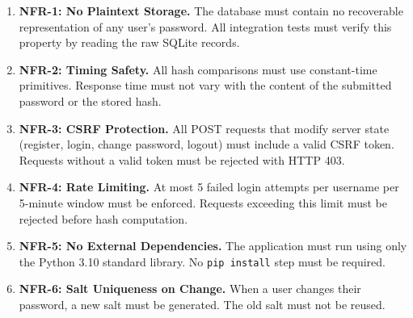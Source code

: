 \begin{enumerate}
  \item \textbf{NFR-1: No Plaintext Storage.} The database must contain no recoverable representation of any user's password. All integration tests must verify this property by reading the raw SQLite records.

  \item \textbf{NFR-2: Timing Safety.} All hash comparisons must use constant-time primitives. Response time must not vary with the content of the submitted password or the stored hash.

  \item \textbf{NFR-3: CSRF Protection.} All POST requests that modify server state (register, login, change password, logout) must include a valid CSRF token. Requests without a valid token must be rejected with HTTP 403.

  \item \textbf{NFR-4: Rate Limiting.} At most 5 failed login attempts per username per 5-minute window must be enforced. Requests exceeding this limit must be rejected before hash computation.

  \item \textbf{NFR-5: No External Dependencies.} The application must run using only the Python 3.10 standard library. No \texttt{pip install} step must be required.

  \item \textbf{NFR-6: Salt Uniqueness on Change.} When a user changes their password, a new salt must be generated. The old salt must not be reused.
\end{enumerate}
